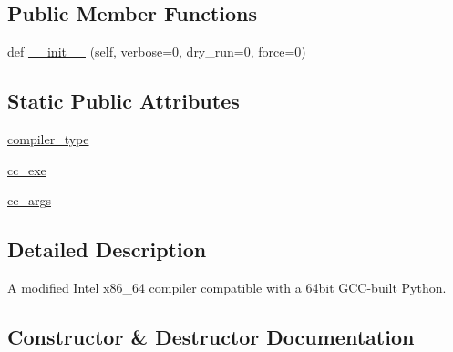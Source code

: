 \subsection*{Public Member Functions}
\begin{DoxyCompactItemize}
\item 
def \hyperlink{classnumpy_1_1distutils_1_1intelccompiler_1_1IntelEM64TCCompiler_a9fbdfb8f50b575600842f709be43d2ce}{\+\_\+\+\_\+init\+\_\+\+\_\+} (self, verbose=0, dry\+\_\+run=0, force=0)
\end{DoxyCompactItemize}
\subsection*{Static Public Attributes}
\begin{DoxyCompactItemize}
\item 
\hyperlink{classnumpy_1_1distutils_1_1intelccompiler_1_1IntelEM64TCCompiler_ae7cf26eafa01bcdd4dd1db1f4f5e00c6}{compiler\+\_\+type}
\item 
\hyperlink{classnumpy_1_1distutils_1_1intelccompiler_1_1IntelEM64TCCompiler_a3cbd55002b71fdfcfc2f4f81f01ca4f5}{cc\+\_\+exe}
\item 
\hyperlink{classnumpy_1_1distutils_1_1intelccompiler_1_1IntelEM64TCCompiler_a64cc2101960462dc9ff4b498d3a14ef6}{cc\+\_\+args}
\end{DoxyCompactItemize}


\subsection{Detailed Description}
\begin{DoxyVerb}A modified Intel x86_64 compiler compatible with a 64bit GCC-built Python.
\end{DoxyVerb}
 

\subsection{Constructor \& Destructor Documentation}
\mbox{\label{classnumpy_1_1distutils_1_1intelccompiler_1_1IntelEM64TCCompiler_a9fbdfb8f50b575600842f709be43d2ce}} 
